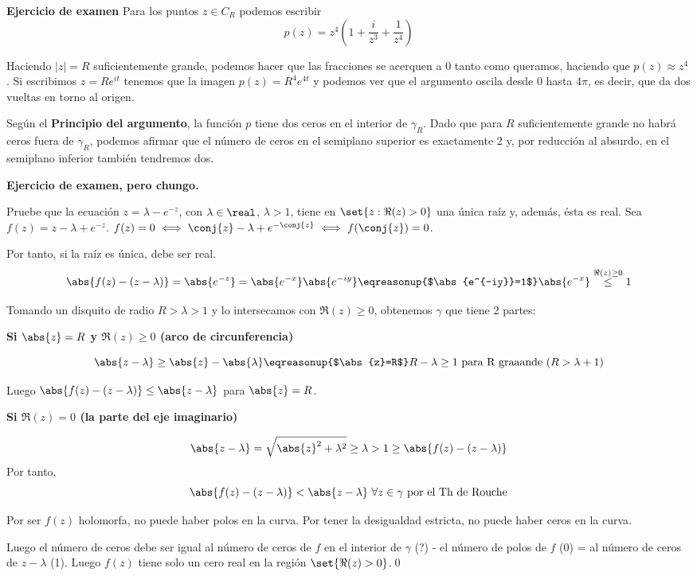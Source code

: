 \begin{problem} {\bf Ejercicio de examen}
Para los puntos $z \in C_R$ podemos escribir
\[p(z)=z^4\left( 1+\frac{i}{z^3}+\frac{1}{z^4}\right)\]

Haciendo $|z|=R$ suficientemente grande, podemos hacer que las fracciones se acerquen a 0 tanto como queramos, haciendo que $p(z)\approx z^4$. Si escribimos $z=R e^{it}$ tenemos que la imagen $p(z)=R^4e^{4t}$ y podemos ver que el argumento oscila desde $0$ hasta $4π$, es decir, que da dos vueltas en torno al origen.

Según el \textbf{Principio del argumento}, la función $p$ tiene dos ceros en el interior de $γ_R$. Dado que para $R$ suficientemente grande no habrá ceros fuera de $γ_R$, podemos afirmar que el número de ceros en el semiplano superior es exactamente 2 y, por reducción al absurdo, en el semiplano inferior también tendremos dos.

\end{problem}

\begin{problem} {\bf Ejercicio de examen, pero chungo.}

Pruebe que la ecuación $z = \lambda - e^{-z}$, con $\lambda \in \real$, $\lambda > 1$, tiene en $\set{z : \Re(z) > 0} $ una única raíz y, además, ésta es real.
\solution
Sea $f(z) = z - \lambda + e^{-z}$. $f(z)=0 \iff \conj{z} - \lambda + e^{-\conj{z}} \iff f(\conj{z}) = 0$.

Por tanto, si la raíz es única, debe ser real.
\[ \abs{f(z) - (z - \lambda)} = \abs{e^{-z}} = \abs{e^{-x}} \abs{e^{-iy}} \eqreasonup{$\abs{e^{-iy}}=1$} \abs{e^{-x}} \stackrel{\Re(z) \geq 0}{\leq} 1 \]

Tomando un disquito de radio $R > \lambda > 1$ y lo intersecamos con $\Re(z) \geq 0$, obtenemos $\gamma$ que tiene 2 partes:

{\bf Si $\abs{z} = R$ y $\Re(z) \geq 0$ (arco de circunferencia)}

\[ \abs{z - \lambda} \geq \abs{z} - \abs{\lambda} \eqreasonup{$\abs{z}=R$} R - \lambda \geq 1 \text{ para R graaande } (R > \lambda + 1) \]

Luego $\abs{f(z) - (z - \lambda)} \leq \abs{z - \lambda}$ para $\abs{z} = R$.

{\bf Si $\Re(z) = 0$ (la parte del eje imaginario)}

\[ \abs{z - \lambda} = \sqrt{\abs{z}^2 + \lambda^2} \geq \lambda > 1 \geq \abs{f(z) - (z - \lambda)} \]
Por tanto,
\[ \abs{f(z) - (z - \lambda)} < \abs{z - \lambda} \ \forall z \in \gamma \text{ por el Th de Rouche} \]

\obs Por ser $f(z)$ holomorfa, no puede haber polos en la curva.
\obs Por tener la desigualdad estricta, no puede haber ceros en la curva.

Luego el número de ceros debe ser igual al número de ceros de $f$ en el interior de $\gamma$ (?) - el número de polos de $f$ (0) = al número de ceros de $z - \lambda$ (1).
Luego $f(z)$ tiene solo un cero real en la región $\set{\Re(z) > 0}$.\hfill\qed
\end{problem}

